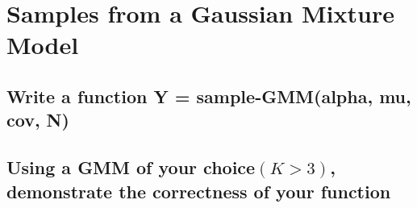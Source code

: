 \documentclass[a4paper]{article}
\begin{document}
        \clearpage
	\section{Samples from a Gaussian Mixture Model}
	\subsection{Write a function Y = sample-GMM(alpha, mu, cov, N)}
	\subsection{Using a GMM of your choice$ (K > 3)$, demonstrate the correctness of your function}
\end{document}
